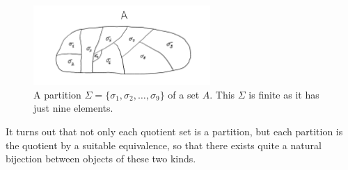 \documentclass[12pt,notitlepage]{article}
\theoremstyle{plain}
\theoremstyle{definition}
\theoremstyle{plain}
\newcommand{\1}{\mathbf{1}}
\newcommand{\0}{\mathbf{0}}
\begin{document}
\begin{figure}[h]
	\centering
	\includegraphics*[width=0.6\textwidth]{part.pdf}
	\caption{A partition $\Sigma = \{\sigma_1, \sigma_2, \ldots, \sigma_9 \}$ of a set $A$. This $\Sigma$ is finite as it has just nine elements.}
\end{figure}

It turns out that not only each quotient set is a partition, but each partition is the quotient by a suitable equivalence, so that there exists quite a natural bijection between objects of these two kinds.
\end{document}
